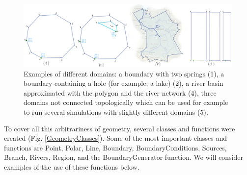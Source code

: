 \documentclass[]{pracamgr}
\begin{document}
      \begin{figure}[H]
        \centering
        \includegraphics[width=1\textwidth]{figs/geometry_examples.jpg}
        \caption{Examples of different domains: a boundary with two springs (1), a boundary containing a hole (for example, a lake) (2), a river basin approximated with the polygon and the river network (4), three domains not connected topologically which can be used for example to run several simulations with slightly different domains (5).}
        \label{geometry_examples}
      \end{figure}
      
      To cover all this arbitrariness of geometry, several classes and functions were created (Fig. \ref{GeometryClasses}). Some of the most important classes and functions are Point, Polar, Line, Boundary, BoundaryConditions, Sources, Branch, Rivers, Region, and the BoundaryGenerator function. We will consider examples of the use of these functions below.
      
\end{document}
